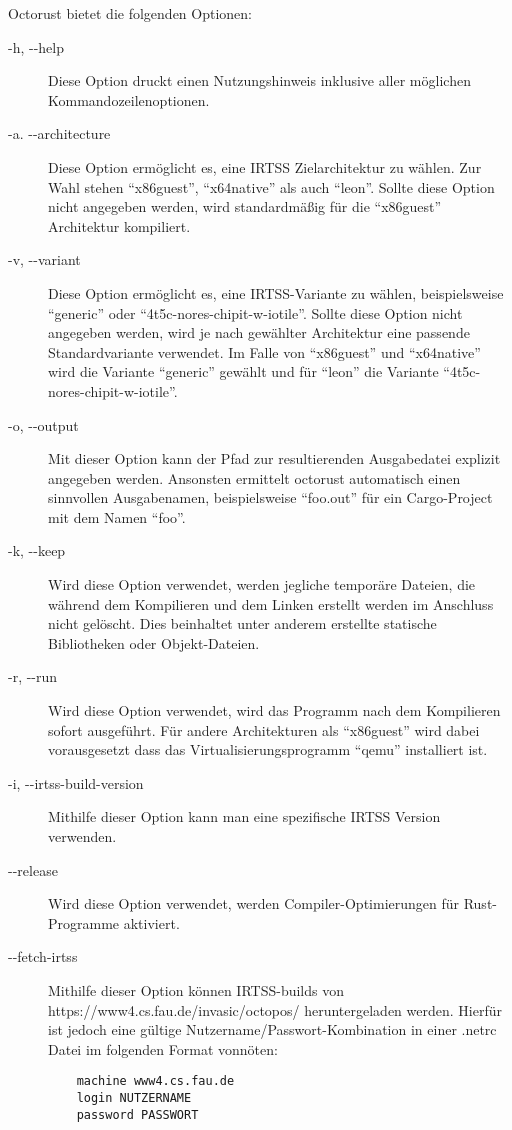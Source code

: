 Octorust bietet die folgenden Optionen:
\begin{description}

	\item[-h, -{}-help]
	Diese Option druckt einen Nutzungshinweis inklusive aller möglichen Kommandozeilenoptionen.
	
	\item[-a. -{}-architecture]
	Diese Option ermöglicht es, eine IRTSS Zielarchitektur zu wählen. Zur Wahl stehen "`x86guest"', "`x64native"' als auch "`leon"'.
	Sollte diese Option nicht angegeben werden, wird standardmäßig für die "`x86guest"' Architektur kompiliert.
	
	\item[-v, -{}-variant]
	Diese Option ermöglicht es, eine IRTSS-Variante zu wählen, beispielsweise "`generic"' oder 	"`4t5c-nores-chipit-w-iotile"'.
	Sollte diese Option nicht angegeben werden, wird je nach gewählter Architektur eine passende Standardvariante verwendet.
	Im Falle von "`x86guest"' und "`x64native"' wird die Variante "`generic"' gewählt und für "`leon"' die Variante
	"`4t5c-nores-chipit-w-iotile"'.
	
	\item[-o, -{}-output]
	Mit dieser Option kann der Pfad zur resultierenden Ausgabedatei explizit angegeben	werden. Ansonsten ermittelt octorust
	automatisch einen sinnvollen Ausgabenamen, beispielsweise "`foo.out"' für ein Cargo-Project mit dem Namen "`foo"'.
	
	\item[-k, -{}-keep]
	Wird diese Option verwendet, werden jegliche temporäre Dateien, die während dem Kompilieren und dem Linken erstellt werden im
	Anschluss nicht gelöscht. Dies beinhaltet unter anderem erstellte statische Bibliotheken oder Objekt-Dateien.
	
	\item[-r, -{}-run]
	Wird diese Option verwendet, wird das Programm nach dem Kompilieren sofort ausgeführt. Für andere Architekturen als
	"`x86guest"' wird dabei vorausgesetzt dass das Virtualisierungsprogramm "`qemu"' installiert ist.
	
	\item[-i, -{}-irtss-build-version]
	Mithilfe dieser Option kann man eine spezifische IRTSS Version verwenden.
	
	\item[-{}-release]
	Wird diese Option verwendet, werden Compiler-Optimierungen für Rust-Programme aktiviert.
	
	\item[-{}-fetch-irtss]
	Mithilfe dieser Option können IRTSS-builds von \\
	https://www4.cs.fau.de/invasic/octopos/ heruntergeladen werden. Hierfür ist jedoch
	eine gültige Nutzername/Passwort-Kombination in einer .netrc Datei im folgenden Format vonnöten:
	\begin{verbatim}
	machine www4.cs.fau.de
	login NUTZERNAME
	password PASSWORT
	\end{verbatim}
\end{description}


